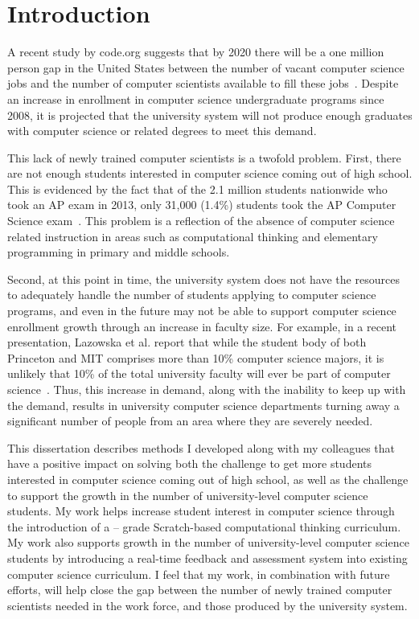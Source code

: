\chapter{Introduction} \label{chap:introduction}
A recent study by code.org suggests that by 2020 there will be a one million
person gap in the United States between the number of vacant computer science
jobs and the number of computer scientists available to fill these
jobs~\cite{codeorg:2013}. Despite an increase in enrollment in computer science
undergraduate programs since 2008, it is projected that the university system
will not produce enough graduates with computer science or related degrees to
meet this demand.

This lack of newly trained computer scientists is a twofold problem. First,
there are not enough students interested in computer science coming out of high
school. This is evidenced by the fact that of the 2.1 million students
nationwide who took an AP exam in 2013, only 31,000 (1.4\%) students took the
AP Computer Science exam~\cite{cb:2013}. This problem is a reflection of the
absence of computer science related instruction in areas such as computational
thinking and elementary programming in primary and middle schools.

Second, at this point in time, the university system does not have the
resources to adequately handle the number of students applying to computer
science programs, and even in the future may not be able to support computer
science enrollment growth through an increase in faculty size. For example, in
a recent presentation, Lazowska et al. report that while the student body of
both Princeton and MIT comprises more than 10\% computer science majors, it is
unlikely that 10\% of the total university faculty will ever be part of
computer science~\cite{lazowska:2014}. Thus, this increase in demand, along
with the inability to keep up with the demand, results in university computer
science departments turning away a significant number of people from an area
where they are severely needed.

This dissertation describes methods I developed along with my colleagues that
have a positive impact on solving both the challenge to get more students
interested in computer science coming out of high school, as well as the
challenge to support the growth in the number of university-level computer
science students. My work helps increase student interest in computer science
through the introduction of a -- grade Scratch-based
computational thinking curriculum. My work also supports growth in the number
of university-level computer science students by introducing a real-time
feedback and assessment system into existing computer science curriculum.  I
feel that my work, in combination with future efforts, will help close the gap
between the number of newly trained computer scientists needed in the work
force, and those produced by the university system.

